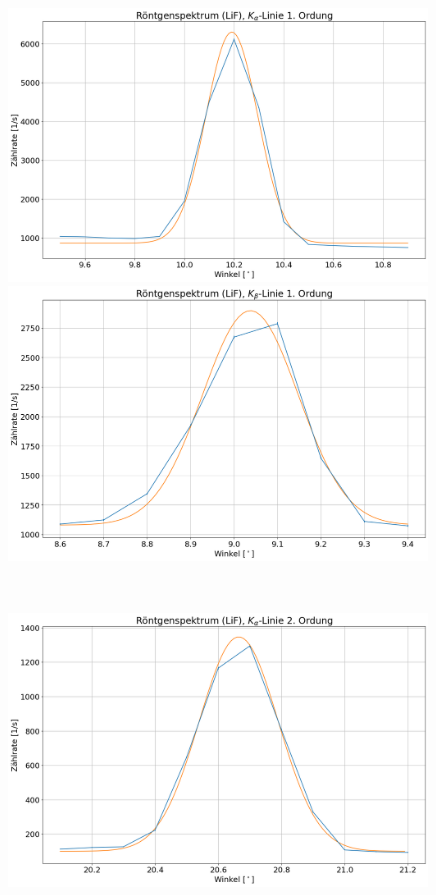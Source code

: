 \begin{figure}[H]
  \centering
  \begin{minipage}{0.5\textwidth}
      \centering
      \includegraphics[width=0.99\textwidth]{files/plots/lif_kalpha_1ord.png}
  \end{minipage}\hfill
  \begin{minipage}{0.5\textwidth}
      \centering
      \includegraphics[width=0.99\textwidth]{files/plots/lif_kbeta_1ord.png}
  \end{minipage}\\
  \begin{minipage}{0.5\textwidth}
    \centering
    \includegraphics[width=0.99\textwidth]{files/plots/lif_kalpha_2ord.png}

\end{minipage}
\end{figure}
